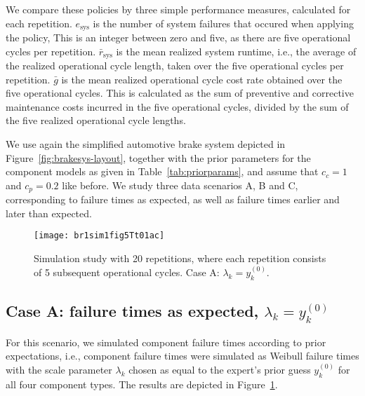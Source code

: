 \documentclass[authoryear]{elsarticle}
\newcommand{\uz}{^{(0)}} %
\def\ykz{y\uz_k}
\newcommand{\esys}{e_\text{sys}}
\newcommand{\mrsys}{\bar{r}_\text{sys}}
\begin{document}
We compare these policies by three simple performance measures,
calculated for each repetition. %
$\esys$ is the number of system failures that occured when applying the policy,
This is an integer between zero and five, as there are five operational cycles per repetition.
$\mrsys$ is the mean realized system runtime,
i.e., the average of the realized operational cycle length,
taken over the five operational cycles per repetition.
$\bar{g}$ is the mean realized operational cycle cost rate obtained over the five operational cycles.
This is calculated as the sum of preventive and corrective maintenance costs incurred in the five operational cycles,
divided by the sum of the five realized operational cycle lengths.

We use again the simplified automotive brake system depicted in Figure~\ref{fig:brakesys-layout},
together with the prior parameters for the component models as given in Table~\ref{tab:priorparams},
and assume that $c_c = 1$ and $c_p = 0.2$ like before.
We study three data scenarios A, B and C, corresponding to failure times as expected, as well as
failure times earlier and later than expected.

\begin{figure}
\texttt{[image: br1sim1fig5Tt01ac]}
\caption{Simulation study with 20 repetitions, where each repetition consists of 5 subsequent operational cycles.
Case A: $\lambda_k = \ykz$.}
\label{fig:br1sim1fig5Tt01}
\end{figure}

\subsection{Case A: failure times as expected, $\lambda_k = \ykz$}
\label{sec:case1}

For this scenario, we simulated component failure times according to prior expectations,
i.e., component failure times were simulated as Weibull failure times
with the scale parameter $\lambda_k$ chosen as equal to the expert's prior guess $\ykz$
for all four component types.
The results are depicted in Figure~\ref{fig:br1sim1fig5Tt01}.
\end{document}

